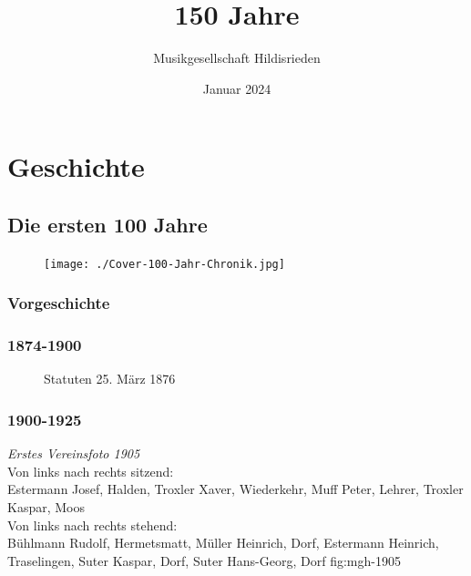 \documentclass[]{book}
\title{150 Jahre}
\author{Musikgesellschaft Hildisrieden}
\date{Januar 2024}
\begin{document}
\frontmatter
\maketitle

\tableofcontents

\mainmatter

\part{Geschichte}
\chapter{Die ersten 100 Jahre}
\begin{figure}[ht]
    \texttt{[image: ./Cover-100-Jahr-Chronik.jpg]}
\end{figure}
\section{Vorgeschichte}



\section{1874-1900}

\begin{figure}[ht]
    \centering
    \hfil
    \caption{Statuten 25. März 1876}
    \label{fig:Statuten-1874}
\end{figure}


\clearpage

\section{1900-1925}

{\emph{Erstes Vereinsfoto 1905}\\
    Von links nach rechts sitzend:\\
    Estermann Josef, Halden, Troxler Xaver, Wiederkehr, Muff Peter, Lehrer,
    Troxler Kaspar, Moos\\
    Von links nach rechts stehend:\\
    Bühlmann Rudolf, Hermetsmatt, Müller Heinrich, Dorf, Estermann Heinrich,
    Traselingen, Suter Kaspar, Dorf, Suter Hans-Georg, Dorf} {fig:mgh-1905}
\end{document}
